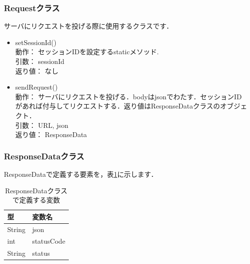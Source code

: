 \documentclass[a4j,titlepage]{jarticle}
\begin{document}
\subsubsection{Requestクラス}
サーバにリクエストを投げる際に使用するクラスです．
\begin{itemize}
\item setSessionId()\\
動作： セッションIDを設定するstaticメソッド.\\
引数： sessionId\\
返り値： なし

\item sendRequest()\\
動作： サーバにリクエストを投げる．bodyはjsonでわたす．セッションIDがあれば付与してリクエストする．返り値はResponseDataクラスのオブジェクト．\\
引数： URL, json\\
返り値： ResponseData
\end{itemize}

\subsubsection{ResponseDataクラス}
ResponseDataで定義する要素を，表\ref{responseTable}に示します．\\
\begin{table}[htb]
\centering
\caption{ResponseDataクラスで定義する変数}
\label{responseTable}
\begin{tabular}{|ll|}
\hline
型 & 変数名       \\ \hline
String & json  \\
int &  statusCode\\
String & status  \\\hline
\end{tabular}
\end{table}
\end{document}

